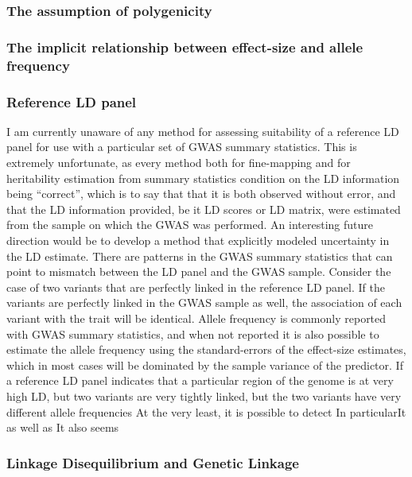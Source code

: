 \subsubsection{The assumption of polygenicity}\label{sec:orgefbe2e8}

\subsubsection{The implicit relationship between effect-size and allele frequency}\label{sec:org3cb4dd7}

\subsubsection{Reference LD panel}\label{sec:org73e10c3}

I am currently unaware of any method for assessing suitability of a reference LD panel for use with a particular set of GWAS summary statistics.  This is extremely unfortunate, as every 
method both for fine-mapping and for heritability estimation from summary statistics condition on the LD information being ``correct'',
which is to say that that it is both observed without error, and that the LD information provided, be it LD scores or LD matrix, were estimated from the sample on which the GWAS was performed.
An interesting future direction would be to develop a method that explicitly modeled uncertainty in the LD estimate.  There are patterns in the GWAS summary statistics that can point to mismatch between
the LD panel and the GWAS sample.  Consider the case of two variants that are perfectly linked in the reference LD panel.  If the variants are perfectly linked in the GWAS sample as well, the association of each variant
with the trait will be identical.  
Allele frequency is commonly reported with GWAS summary statistics, and when not reported it is also possible to estimate the allele frequency using the standard-errors of the effect-size estimates,
which in most cases will be dominated by the sample variance of the predictor.  If a reference LD panel indicates that a particular region of the genome is at very high LD, but two variants are very tightly linked, but the two variants have very different
allele frequencies 
At the very least, it is possible to detect In particularIt as well as  It also seems 


\subsubsection{Linkage Disequilibrium and Genetic Linkage}\label{sec:orgd025d4b}

